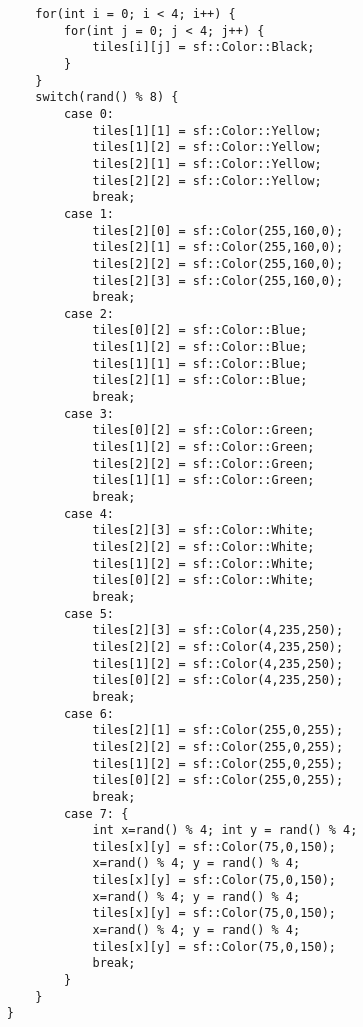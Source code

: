 \documentclass[11pt]{amsart}
\begin{document}
\begin{verbatim}
	    for(int i = 0; i < 4; i++) {
	        for(int j = 0; j < 4; j++) {
	            tiles[i][j] = sf::Color::Black;
	        }
	    }
	    switch(rand() % 8) {
	        case 0:
	            tiles[1][1] = sf::Color::Yellow;
	            tiles[1][2] = sf::Color::Yellow;
	            tiles[2][1] = sf::Color::Yellow;
	            tiles[2][2] = sf::Color::Yellow;
	            break;
	        case 1:
	            tiles[2][0] = sf::Color(255,160,0);
	            tiles[2][1] = sf::Color(255,160,0);
	            tiles[2][2] = sf::Color(255,160,0);
	            tiles[2][3] = sf::Color(255,160,0);
	            break;
	        case 2:
	            tiles[0][2] = sf::Color::Blue;
	            tiles[1][2] = sf::Color::Blue;
	            tiles[1][1] = sf::Color::Blue;
	            tiles[2][1] = sf::Color::Blue;
	            break;
	        case 3:
	            tiles[0][2] = sf::Color::Green;
	            tiles[1][2] = sf::Color::Green;
	            tiles[2][2] = sf::Color::Green;
	            tiles[1][1] = sf::Color::Green;
	            break;
	        case 4:
	            tiles[2][3] = sf::Color::White;
	            tiles[2][2] = sf::Color::White;
	            tiles[1][2] = sf::Color::White;
	            tiles[0][2] = sf::Color::White;
	            break;
	        case 5:
	            tiles[2][3] = sf::Color(4,235,250);
	            tiles[2][2] = sf::Color(4,235,250);
	            tiles[1][2] = sf::Color(4,235,250);
	            tiles[0][2] = sf::Color(4,235,250);
	            break;
	        case 6:
	            tiles[2][1] = sf::Color(255,0,255);
	            tiles[2][2] = sf::Color(255,0,255);
	            tiles[1][2] = sf::Color(255,0,255);
	            tiles[0][2] = sf::Color(255,0,255);
	            break;
	        case 7: {
	            int x=rand() % 4; int y = rand() % 4;
	            tiles[x][y] = sf::Color(75,0,150);
	            x=rand() % 4; y = rand() % 4;
	            tiles[x][y] = sf::Color(75,0,150);
	            x=rand() % 4; y = rand() % 4;
	            tiles[x][y] = sf::Color(75,0,150);
	            x=rand() % 4; y = rand() % 4;
	            tiles[x][y] = sf::Color(75,0,150);
	            break;
	        }
	    }
	}


\end{verbatim}
\end{document}
